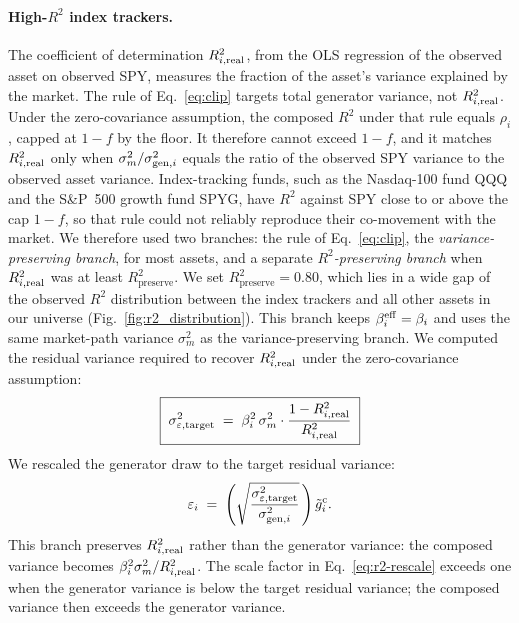 \paragraph{High-$R^2$ index trackers.}

The coefficient of determination $R^2_{i,\mathrm{real}}$, from the OLS
regression of the observed asset on observed SPY, measures the
fraction of the asset's variance explained by the market. The rule of
Eq.~\eqref{eq:clip} targets total generator variance, not
$R^2_{i,\mathrm{real}}$. Under the zero-covariance
assumption, the composed $R^2$ under that rule equals $\rho_i$, capped
at $1-f$ by the floor. It therefore cannot exceed $1-f$, and it matches $R^2_{i,\mathrm{real}}$ only
when $\sigma_m^2/\sigma_{\mathrm{gen},i}^2$ equals the ratio of the observed SPY
variance to the observed asset variance. Index-tracking funds, such as the Nasdaq-100 fund QQQ and the
S\&P~500 growth fund SPYG, have $R^2$ against SPY close to or above
the cap $1-f$, so that rule could not reliably reproduce their co-movement with the
market. We therefore used two branches: the rule of
Eq.~\eqref{eq:clip}, the \emph{variance-preserving branch}, for most
assets, and a separate \emph{$R^2$-preserving branch} when
$R^2_{i,\mathrm{real}}$ was at least $R^2_{\mathrm{preserve}}$. We set $R^2_{\mathrm{preserve}}=0.80$,
which lies in a wide gap of the observed $R^2$ distribution between
the index trackers and all other assets in our universe
(Fig.~\ref{fig:r2_distribution}). This branch keeps $\beta_i^{\mathrm{eff}}=\beta_i$ and uses the same
market-path variance $\sigma_m^2$ as the variance-preserving branch.
We computed the residual variance required to recover $R^2_{i,\mathrm{real}}$
under the zero-covariance
assumption:
\begin{equation}
  \boxed{\;\sigma_{\varepsilon,\mathrm{target}}^2 \;=\; \beta_i^2\, \sigma_m^2 \cdot
    \frac{1 - R^2_{i,\mathrm{real}}}{R^2_{i,\mathrm{real}}}\;}
  \label{eq:r2-target}
\end{equation}
We rescaled the generator draw to the target residual variance:
\begin{equation}
  \varepsilon_i \;=\; \left(\sqrt{\frac{\sigma_{\varepsilon,\mathrm{target}}^2}{\sigma_{\mathrm{gen},i}^2}}\,\right)\tilde{g}_i^{\mathrm c}.
  \label{eq:r2-rescale}
\end{equation}
This branch preserves $R^2_{i,\mathrm{real}}$ rather than the generator
variance: the composed variance becomes
$\beta_i^2\sigma_m^2/R^2_{i,\mathrm{real}}$. The scale factor in Eq.~\eqref{eq:r2-rescale} exceeds one when the generator variance is below the target residual
variance; the composed variance then exceeds the generator variance.

